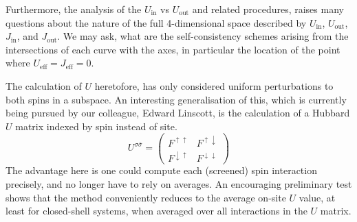 Furthermore,  
the analysis of the 
$U_\textrm{in}$ vs $U_\textrm{out}$ 
and related procedures, 
raises many questions about the 
nature of the full 4-dimensional space described by  
$U_\textrm{in}$, $U_\textrm{out}$, 
$J_\textrm{in}$, and $J_\textrm{out}$.
%
We may ask, 
what are the self-consistency schemes 
arising from the intersections of each curve with the axes, 
in particular the location of the point where 
$U_\textrm{eff}=J_\textrm{eff}=0$.


The calculation of $U$ heretofore, 
has only considered uniform  
perturbations to both spins in a subspace.
%
An interesting generalisation of this, 
which is currently being pursued by our colleague, 
Edward Linscott, 
is the calculation of a Hubbard $U$ matrix 
indexed by spin instead of site.
%
\begin{equation}
U^{\sigma\bar\sigma}=
\left(\begin{array}{cc}
F^{\uparrow\uparrow} & F^{\uparrow\downarrow} \\
F^{\downarrow\uparrow} & F^{\downarrow\downarrow}
\end{array}
\right)
\end{equation}
%
The advantage here is one could compute 
each (screened) spin interaction precisely, 
and no longer have to rely on averages.
%
An encouraging preliminary test 
shows that the method conveniently reduces 
to the average on-site $U$ value, 
at least for closed-shell systems, 
when averaged over all interactions in the $U$ matrix.


